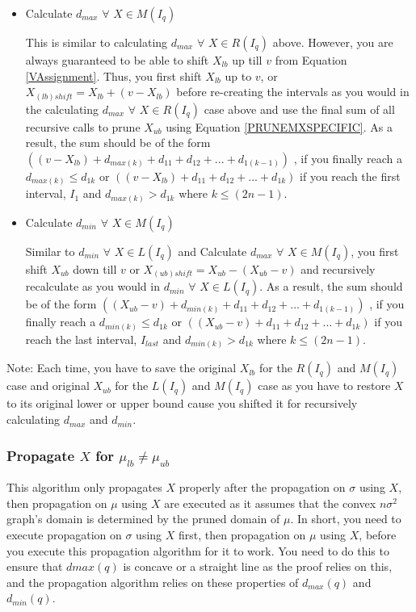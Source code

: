 \documentclass[a4paper,12pt]{article}
\begin{document}
\begin{itemize}
\item Calculate $d_{max}$ $\forall$ $X \in M(I_{q})$

This is similar to calculating $d_{max}$ $\forall$ $X \in R(I_{q})$ above. However, you are always guaranteed to be able to shift $X_{lb}$ up till $v$ from Equation \ref{VAssignment}. Thus, you first shift $X_{lb}$ up to $v$, or $X_{(lb)shift} = X_{lb} + (v - X_{lb})$ before re-creating the intervals as you would in the calculating $d_{max}$ $\forall$ $X \in R(I_{q})$ case above and use the final sum of all recursive calls to prune $X_{ub}$ using Equation \ref{PRUNEMXSPECIFIC}. As a result, the sum should be of the form $((v - X_{lb}) + d_{max(k)} + d_{11} + d_{12} + ... + d_{1(k-1)})$ , if you finally reach a $d_{max(k)} \leq d_{1k}$  or $((v - X_{lb}) + d_{11} + d_{12} + ... + d_{1k})$ if you reach the first interval, $I_{1}$ and $d_{max(k)} > d_{1k}$ where $k \leq (2n-1)$.

\item Calculate $d_{min}$ $\forall$ $X \in M(I_{q})$

Similar to $d_{min}$ $\forall$ $X \in L(I_{q})$ and Calculate $d_{max}$ $\forall$ $X \in M(I_{q})$, you first shift $X_{ub}$ down till $v$ or $X_{(ub)shift} = X_{ub} - (X_{ub}-v)$ and recursively recalculate as you would in $d_{min}$ $\forall$ $X \in L(I_{q})$. As a result, the sum should be of the form  $((X_{ub}-v) + d_{min(k)} + d_{11} + d_{12} + ... + d_{1(k-1)})$ , if you finally reach a $d_{min(k)} \leq d_{1k}$ or $((X_{ub}-v) + d_{11} + d_{12} + ... + d_{1k})$ if you reach the last interval, $I_{last}$ and $d_{min(k)} > d_{1k}$ where $k \leq (2n-1)$.

\end{itemize} 

Note: Each time, you have to save the original $X_{lb}$ for the $R(I_{q})$ and $M(I_{q})$ case and original $X_{ub}$ for the $L(I_{q})$ and $M(I_{q})$ case as you have to restore $X$ to its original lower or upper bound cause you shifted it for recursively calculating $d_{max}$ and  $d_{min}$.

\subsubsection{Propagate $X$ for $\mu_{lb}\neq\mu_{ub}$}
This algorithm only propagates $X$ properly after the propagation on $\sigma$ using $X$, then propagation on $\mu$ using $X$ are executed as it assumes that the convex $n\sigma^2$ graph's domain is determined by the pruned domain of $\mu$. In short, you need to execute propagation on $\sigma$ using $X$ first, then propagation on $\mu$ using $X$, before you execute this propagation algorithm for it to work. You need to do this to ensure that $dmax(q)$ is concave or a straight line as the proof relies on this, and the propagation algorithm relies on these properties of $d_{max}(q)$ and $d_{min}(q)$.  
\end{document}
